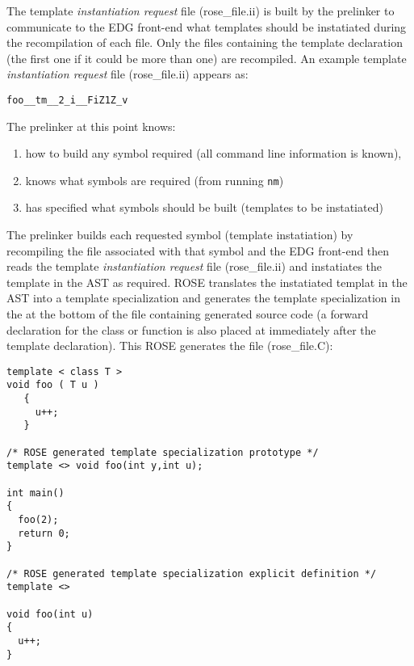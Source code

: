 {The template {\em instantiation request} file (rose\_file.ii) is built by the prelinker 
to communicate to the EDG front-end what templates should be instatiated during the 
recompilation of each file.  Only the files containing the template declaration
(the first one if it could be more than one) are recompiled.  An example template 
{\em instantiation request} file (rose\_file.ii) appears as:

{\indent
{\mySmallFontSize

\begin{verbatim}
foo__tm__2_i__FiZ1Z_v
\end{verbatim}
}}

   The prelinker at this point knows:
\begin{enumerate}
   \item how to build any symbol required (all command line information is known),
   \item knows what symbols are required (from running {\tt nm})
   \item has specified what symbols should be built (templates to be instatiated)
\end{enumerate}

  The prelinker builds each requested symbol (template instatiation) by recompiling
the file associated with that symbol and the EDG front-end then reads the template 
{\em instantiation request} file (rose\_file.ii) and instatiates the template
in the AST as required.  ROSE translates the instatiated templat in the AST into
a template specialization and generates the template specialization in the 
at the bottom of the file containing generated source code (a forward declaration
for the class or function is also placed at immediately after the template declaration).
This ROSE generates the file (rose\_file.C):

{\indent
{\mySmallFontSize

\begin{verbatim}
template < class T >
void foo ( T u )
   {
     u++;
   }

/* ROSE generated template specialization prototype */
template <> void foo(int y,int u);

int main()
{
  foo(2);
  return 0;
}

/* ROSE generated template specialization explicit definition */
template <> 

void foo(int u)
{
  u++;
}
\end{verbatim}
}}

}
